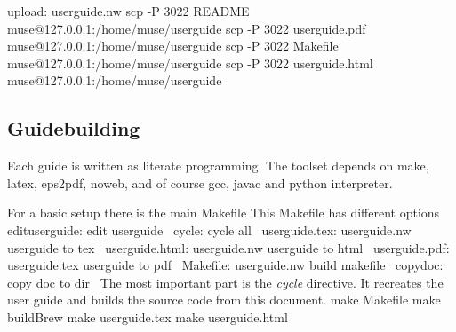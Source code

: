 \documentclass{llncs}%
\begin{document}
upload: userguide.nw
        scp -P 3022 README muse@127.0.0.1:/home/muse/userguide
        scp -P 3022 userguide.pdf muse@127.0.0.1:/home/muse/userguide
        scp -P 3022 Makefile muse@127.0.0.1:/home/muse/userguide
        scp -P 3022 userguide.html muse@127.0.0.1:/home/muse/userguide
        
\nwendcode{}\nwdocspar

\subsection{Guidebuilding}
Each guide is written as literate programming. The toolset depends on make, latex, eps2pdf, noweb, and of course gcc, javac and python interpreter.

For a basic setup there is the main Makefile
This Makefile has different options 
\nwenddocs{}\endmoddef\nwstartdeflinemarkup{}\nwenddeflinemarkup
edituserguide:
        \LA{}edit userguide~{\nwtagstyle{}}\RA{}
cycle:
        \LA{}cycle all~{\nwtagstyle{}}\RA{}
userguide.tex: userguide.nw
        \LA{}userguide to tex~{\nwtagstyle{}}\RA{}
userguide.html: userguide.nw
        \LA{}userguide to html~{\nwtagstyle{}}\RA{}
userguide.pdf: userguide.tex
        \LA{}userguide to pdf~{\nwtagstyle{}}\RA{}
Makefile: userguide.nw
        \LA{}build makefile~{\nwtagstyle{}}\RA{}
copydoc:
        \LA{}copy doc to dir~{\nwtagstyle{}}\RA{}
\nwendcode{}\nwdocspar
The most important part is the {\em cycle} directive. It recreates the user guide and builds the source code from this document.
\nwenddocs{}\endmoddef\nwstartdeflinemarkup{}\nwenddeflinemarkup
        make Makefile
        make buildBrew
        make userguide.tex
        make userguide.html
\end{document}
